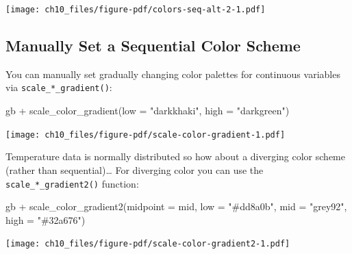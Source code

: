 \documentclass[
  letterpaper,
]{scrbook}
\newenvironment{Shaded}{\begin{snugshade}}{\end{snugshade}}
\newcommand{\AttributeTok}[1]{\textcolor[rgb]{0.40,0.45,0.13}{#1}}
\newcommand{\DocumentationTok}[1]{\textcolor[rgb]{0.37,0.37,0.37}{\textit{#1}}}
\newcommand{\FunctionTok}[1]{\textcolor[rgb]{0.28,0.35,0.67}{#1}}
\newcommand{\NormalTok}[1]{\textcolor[rgb]{0.00,0.23,0.31}{#1}}
\newcommand{\OtherTok}[1]{\textcolor[rgb]{0.00,0.23,0.31}{#1}}
\newcommand{\SpecialCharTok}[1]{\textcolor[rgb]{0.37,0.37,0.37}{#1}}
\newcommand{\StringTok}[1]{\textcolor[rgb]{0.13,0.47,0.30}{#1}}
\begin{document}
\begin{Shaded}
\end{Shaded}

\texttt{[image: ch10\_files/figure-pdf/colors-seq-alt-2-1.pdf]}

\subsection{Manually Set a Sequential Color
Scheme}\label{manually-set-a-sequential-color-scheme}

You can manually set gradually changing color palettes for continuous
variables via \texttt{scale\_*\_gradient()}:

\begin{Shaded}
\begin{Highlighting}[]
\NormalTok{gb }\SpecialCharTok{+} \FunctionTok{scale\_color\_gradient}\NormalTok{(}\AttributeTok{low =} \StringTok{"darkkhaki"}\NormalTok{,}
                          \AttributeTok{high =} \StringTok{"darkgreen"}\NormalTok{)}
\end{Highlighting}
\end{Shaded}

\texttt{[image: ch10\_files/figure-pdf/scale-color-gradient-1.pdf]}

Temperature data is normally distributed so how about a diverging color
scheme (rather than sequential)\ldots{} For diverging color you can use
the \texttt{scale\_*\_gradient2()} function:

\begin{Shaded}
\begin{Highlighting}[]
\NormalTok{gb }\SpecialCharTok{+} \FunctionTok{scale\_color\_gradient2}\NormalTok{(}\AttributeTok{midpoint =}\NormalTok{ mid, }\AttributeTok{low =} \StringTok{"\#dd8a0b"}\NormalTok{,}
                           \AttributeTok{mid =} \StringTok{"grey92"}\NormalTok{, }\AttributeTok{high =} \StringTok{"\#32a676"}\NormalTok{)}
\end{Highlighting}
\end{Shaded}

\texttt{[image: ch10\_files/figure-pdf/scale-color-gradient2-1.pdf]}
\end{document}
